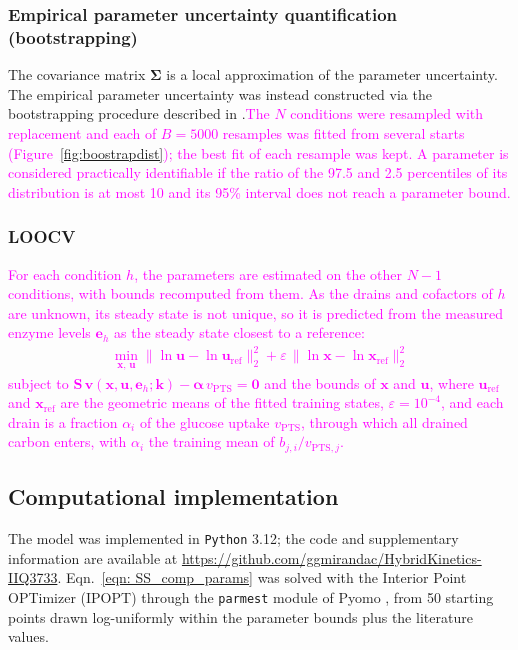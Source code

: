 \documentclass[conference]{IEEEtran}
\begin{document}
\subsubsection{Empirical parameter uncertainty quantification (bootstrapping)}
The covariance matrix $\mathbf{\Sigma}$ is a local approximation of the parameter uncertainty. The empirical parameter uncertainty was instead constructed via the bootstrapping procedure described in \textcite{Justus2024BootstrapConfidenceIntervals}.\textcolor{magenta}{The $N$ conditions were resampled with replacement and each of $B = 5000$ resamples was fitted from several starts (Figure~\ref{fig:boostrapdist}); the best fit of each resample was kept. A parameter is considered practically identifiable if the ratio of the 97.5 and 2.5 percentiles of its distribution is at most 10 and its 95\% interval does not reach a parameter bound.}


\subsubsection{LOOCV}
\textcolor{magenta}{For each condition $h$, the parameters are estimated on the other $N-1$ conditions, with bounds recomputed from them. As the drains and cofactors of $h$ are unknown, its steady state is not unique, so it is predicted from the measured enzyme levels $\mathbf{e}_h$ as the steady state closest to a reference:
\begin{align}
    \min_{\mathbf{x},\,\mathbf{u}} \|\ln\mathbf{u}-\ln\mathbf{u}_{\text{ref}}\|_2^2 + \varepsilon\,\|\ln\mathbf{x}-\ln\mathbf{x}_{\text{ref}}\|_2^2 \label{eqn: loocv}
\end{align}
subject to $\mathbf{S}\,\mathbf{v}(\mathbf{x},\mathbf{u},\mathbf{e}_h;\mathbf{k}) - \boldsymbol{\alpha}\,v_{\text{PTS}} = \mathbf{0}$ and the bounds of $\mathbf{x}$ and $\mathbf{u}$, where $\mathbf{u}_{\text{ref}}$ and $\mathbf{x}_{\text{ref}}$ are the geometric means of the fitted training states, $\varepsilon = 10^{-4}$, and each drain is a fraction $\alpha_i$ of the glucose uptake $v_{\text{PTS}}$, through which all drained carbon enters, with $\alpha_i$ the training mean of $b_{j,i}/v_{\text{PTS},j}$.}


\subsection{Computational implementation} 

The model was implemented in \texttt{Python} 3.12; the code and supplementary information are available at \href{https://github.com/ggmirandac/HybridKinetics-IIQ3733}{https://github.com/ggmirandac/HybridKinetics-IIQ3733}. Eqn.~\ref{eqn: SS_comp_params} was solved with the Interior Point OPTimizer (IPOPT) \cite{wachter2006implementation} through the \texttt{parmest} module of Pyomo \cite{Bynum2021PyomooptimizationModelingPython}, from 50 starting points drawn log-uniformly within the parameter bounds plus the literature values.
\end{document}
